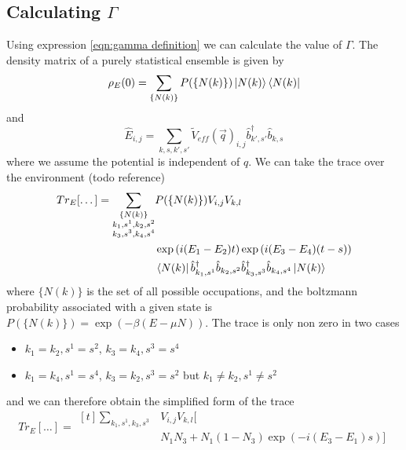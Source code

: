 \subsection{Calculating \(\Gamma \)}
Using expression \cref{eqn:gamma definition}
we can calculate the value of \(\Gamma \).
The
density matrix of a purely
statistical ensemble is given
by~\cite{sakurai_napolitano_2020}
\begin{equation}
  \rho_E(0) = \sum_{\{N(k)\}}
  P(\{N(k)\})
  \ket{N(k)} \bra{N(k)}
\end{equation}
and
\begin{equation}
  \hat{E}_{i,j} = \sum_{k,s,k',s'}
  {\tilde{V}_{eff}(\vec{q})}_{i,j}
  \hat{b}^\dagger_{k',s'}\hat{b}_{k,s}
\end{equation}
where we assume the potential
is independent of \(q\). We can
take the trace over the
environment (todo reference)
\begin{equation}
  Tr_E[\dots]  = \begin{aligned}[t]
    \sum_{\substack{\{N(k)\}                             \\
    k_1,s^1,k_2,s^2                                      \\
        k_3,s^3,k_4,s^4 }}
     & P(\{N(k)\}) V_{i,j} V_{k,l}                       \\
     & \exp{(i(E_1 - E_2) t)} \exp{(i(E_3 - E_4) (t-s))} \\
     & \bra{N(k)}
    \hat{b}_{k_1,s^1}^\dagger{} \hat{b}_{k_2,s^2}
    \hat{b}_{k_3,s^3}^\dagger{} \hat{b}_{k_4,s^4}
    \ket{N(k)}
  \end{aligned}
\end{equation}
where \( \{N(k)\} \) is the set of
all possible occupations, and
the boltzmann
probability associated with a
given state is
\(P(\{N(k)\}) = \exp{(-\beta{}(E-\mu N))}\).
The trace is only non zero in two
cases
\begin{itemize}
  \item \(k_1=k_2, s^1=s^2\),
        \(k_3=k_4, s^3=s^4\)
  \item \(k_1=k_4, s^1=s^4\),
        \(k_3=k_2, s^3=s^2\) but
        \(k_1\neq{}k_2, s^1\neq{}s^2\)
\end{itemize}
and we can therefore obtain the
simplified form of the trace
\begin{equation}
  Tr_E[\dots] = \begin{aligned}[t]
    \sum_{k_1,s^1,k_3,s^3 }
     & V_{i,j} V_{k,l} [ \\
     & N_1 N_3
        + N_1 (1 - N_3) \exp{(-i(E_3 - E_1)s)}]
  \end{aligned}
\end{equation}
